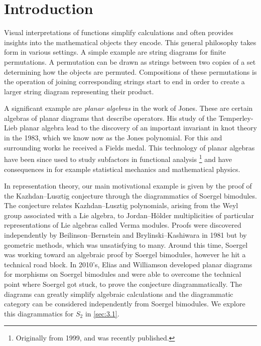 \chapter{Introduction}

Visual interpretations of functions simplify calculations and often provides insights into the mathematical objects they encode.  This general philosophy takes form in various settings. A simple example are string diagrams for finite permutations. A permutation can be drawn as strings between two copies of a set determining how the objects are permuted. Compositions of these permutations is the operation of joining corresponding strings start to end in order to create a larger string diagram representing their product. 

A significant example are \textit{planar algebras} in the work of Jones. These are certain algebras of planar diagrams that describe operators. His study of the Temperley-Lieb planar algebra lead to the discovery of an important invariant in knot theory in the 1983, which we know now as the Jones polynomial. For this and surrounding works he received a Fields medal. This technology of planar algebras have been since used to study subfactors in functional analysis \cite{jones-planar-algebra}\footnote{Originally from 1999, and was recently published.} and have consequences in for example statistical mechanics and mathematical physics.

In representation theory, our main motivational example is given by the proof of the Kazhdan--Lusztig conjecture through the diagrammatics of Soergel bimodules. The conjecture relates Kazhdan--Lusztig polynomials, arising from the Weyl group associated with a Lie algebra, to Jordan--H\"older multiplicities of particular representations of Lie algebras called Verma modules. Proofs were discovered independently by Beilinson--Bernstein and Brylinski--Kashiwara in 1981 but by geometric methods, which was unsatisfying to many. Around this time, Soergel was working toward an algebraic proof by Soergel bimodules, however he hit a technical road block. In 2010's, Elias and Williamson  developed planar diagrams for morphisms on Soergel bimodules and were able to overcome the technical point where Soergel got stuck, to prove the conjecture diagrammatically. The diagrams can greatly simplify algebraic calculations and the diagrammatic category can be considered independently from Soergel bimodules. We explore this diagrammatics for $S_2$ in \autoref{sec:3.1}.


